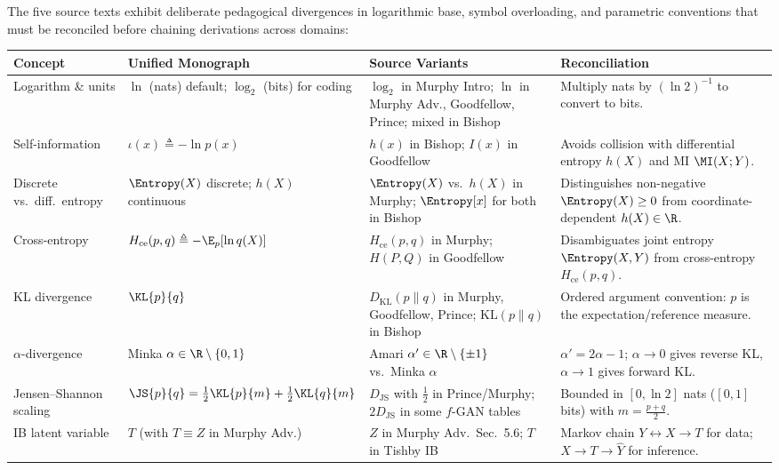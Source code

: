 \documentclass[../../../../master.tex]{subfiles}
\begin{document}
\begin{crossbook}
\label{cb:infotheory:notation}
The five source texts exhibit deliberate pedagogical divergences in logarithmic base, symbol overloading, and parametric conventions that must be reconciled before chaining derivations across domains:
\vspace{4pt}
\begin{center}
\small
\begin{tabularx}{\linewidth}{@{}l>{\raggedright\arraybackslash}X>{\raggedright\arraybackslash}X>{\raggedright\arraybackslash}X@{}}
\toprule
\textbf{Concept} & \textbf{Unified Monograph} & \textbf{Source Variants} & \textbf{Reconciliation} \\
\midrule
Logarithm \& units & $\ln$ (nats) default; $\log_2$ (bits) for coding & $\log_2$ in Murphy Intro; $\ln$ in Murphy Adv., Goodfellow, Prince; mixed in Bishop & Multiply nats by $(\ln 2)^{-1}$ to convert to bits. \\
Self-information & $\iota(x) \triangleq -\ln p(x)$ & $h(x)$ in Bishop; $I(x)$ in Goodfellow & Avoids collision with differential entropy $h(X)$ and MI $\MI(X;Y)$. \\
Discrete vs.\ diff.\ entropy & $\Entropy(X)$ discrete; $h(X)$ continuous & $\Entropy(X)$ vs.\ $h(X)$ in Murphy; $\Entropy[x]$ for both in Bishop & Distinguishes non-negative $\Entropy(X)\ge 0$ from coordinate-dependent $h(X)\in\R$. \\
Cross-entropy & $H_{\mathrm{ce}}(p, q) \triangleq -\E_p[\ln q(X)]$ & $H_{\mathrm{ce}}(p,q)$ in Murphy; $H(P,Q)$ in Goodfellow & Disambiguates joint entropy $\Entropy(X,Y)$ from cross-entropy $H_{\mathrm{ce}}(p,q)$. \\
KL divergence & $\KL{p}{q}$ & $D_{\mathrm{KL}}(p\|q)$ in Murphy, Goodfellow, Prince; $\mathrm{KL}(p\|q)$ in Bishop & Ordered argument convention: $p$ is the expectation/reference measure. \\
$\alpha$-divergence & Minka $\alpha \in \R\setminus\{0,1\}$ & Amari $\alpha' \in \R\setminus\{\pm 1\}$ vs.\ Minka $\alpha$ & $\alpha' = 2\alpha - 1$; $\alpha \to 0$ gives reverse KL, $\alpha \to 1$ gives forward KL. \\
Jensen--Shannon scaling & $\JS{p}{q} = \frac{1}{2}\KL{p}{m} + \frac{1}{2}\KL{q}{m}$ & $D_{\mathrm{JS}}$ with $\frac{1}{2}$ in Prince/Murphy; $2D_{\mathrm{JS}}$ in some $f$-GAN tables & Bounded in $[0, \ln 2]$ nats ($[0,1]$ bits) with $m = \frac{p+q}{2}$. \\
IB latent variable & $T$ (with $T \equiv Z$ in Murphy Adv.) & $Z$ in Murphy Adv.\ Sec.~5.6; $T$ in Tishby IB & Markov chain $Y \leftrightarrow X \to T$ for data; $X \to T \to \hat{Y}$ for inference. \\

\end{tabularx}
\end{center}
\end{crossbook}
\end{document}
